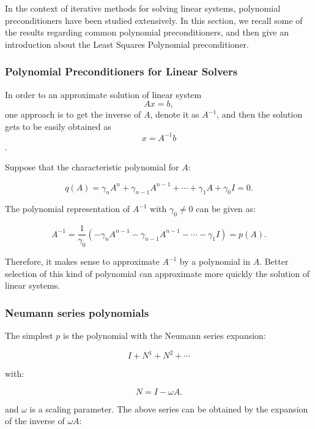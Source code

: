 In the context of iterative methods for solving linear systems, polynomial preconditioners have been studied extensively. In this section, we recall some of the results regarding common polynomial preconditioners, and then give an introduction about the Least Squares Polynomial preconditioner.

\subsubsection{Polynomial Preconditioners for Linear Solvers}

In order to an approximate solution of linear system \[Ax=b,\]one approach is to get the inverse of $A$, denote it as $A^{-1}$, and then the solution gets to be easily obtained as \[x=A^{-1}b\].

Suppose that the characteristic polynomial for $A$:

\begin{equation}
q(A) = \gamma_nA^n+\gamma_{n-1}A^{n-1}+\cdots+\gamma_1A+\gamma_0I = 0.
\end{equation}

The polynomial representation of $A^{-1}$ with $\gamma_0 \neq 0$ can be given as:

\begin{equation}
A^{-1}=\frac{1}{\gamma_0}(-\gamma_nA^{n-1}-\gamma_{n-1}A^{n-1}-\cdots-\gamma_1I)=p(A).
\end{equation}

Therefore, it makes sense to approximate $A^{-1}$ by a polynomial in $A$.  Better selection of this kind of polynomial can approximate more quickly the solution of linear systems.

\subsubsection{Neumann series polynomials}

The simplest $p$ is the polynomial with the Neumann series expansion:

\begin{equation}
I+N^1+N^2+\cdots
\end{equation}

with:

\begin{equation}
N=I-\omega A.
\end{equation}

and $\omega$ is a scaling parameter. The above series can be obtained by the expansion of the inverse of $\omega A$:


